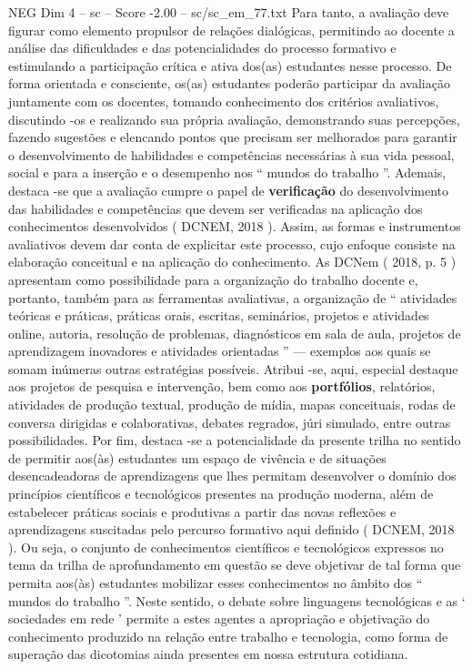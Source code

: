 \begin{textsample}{NEG Dim 4 – sc – Score -2.00 – sc/sc\_em\_77.txt}
Para tanto, a avaliação deve figurar como elemento propulsor de relações dialógicas, permitindo ao docente a análise das dificuldades e das potencialidades do processo formativo e estimulando a participação crítica e ativa dos(as) estudantes nesse processo.
De forma orientada e consciente, os(as) estudantes poderão participar da avaliação juntamente com os docentes, tomando conhecimento dos critérios avaliativos, discutindo -os e realizando sua própria avaliação, demonstrando suas percepções, fazendo sugestões e elencando pontos que precisam ser melhorados para garantir o desenvolvimento de habilidades e competências necessárias à sua vida pessoal, social e para a inserção e o desempenho nos “ mundos do trabalho ”.
Ademais, destaca -se que a avaliação cumpre o papel de \textbf{verificação} do desenvolvimento das habilidades e competências que devem ser verificadas na aplicação dos conhecimentos desenvolvidos ( DCNEM, 2018 ).
Assim, as formas e instrumentos avaliativos devem dar conta de explicitar este processo, cujo enfoque consiste na elaboração conceitual e na aplicação do conhecimento.
As DCNem ( 2018, p. 5 ) apresentam como possibilidade para a organização do trabalho docente e, portanto, também para as ferramentas avaliativas, a organização de “ atividades teóricas e práticas, práticas orais, escritas, seminários, projetos e atividades online, autoria, resolução de problemas, diagnósticos em sala de aula, projetos de aprendizagem inovadores e atividades orientadas ” — exemplos aos quais se somam inúmeras outras estratégias possíveis.
Atribui -se, aqui, especial destaque aos projetos de pesquisa e intervenção, bem como aos \textbf{portfólios}, relatórios, atividades de produção textual, produção de mídia, mapas conceituais, rodas de conversa dirigidas e colaborativas, debates regrados, júri simulado, entre outras possibilidades.
Por fim, destaca -se a potencialidade da presente trilha no sentido de permitir aos(às) estudantes um espaço de vivência e de situações desencadeadoras de aprendizagens que lhes permitam desenvolver o domínio dos princípios científicos e tecnológicos presentes na produção moderna, além de estabelecer práticas sociais e produtivas a partir das novas reflexões e aprendizagens suscitadas pelo percurso formativo aqui definido ( DCNEM, 2018 ).
Ou seja, o conjunto de conhecimentos científicos e tecnológicos expressos no tema da trilha de aprofundamento em questão se deve objetivar de tal forma que permita aos(às) estudantes mobilizar esses conhecimentos no âmbito dos “ mundos do trabalho ”.
Neste sentido, o debate sobre linguagens tecnológicas e as ‘ sociedades em rede ’ permite a estes agentes a apropriação e objetivação do conhecimento produzido na relação entre trabalho e tecnologia, como forma de superação das dicotomias ainda presentes em nossa estrutura cotidiana.

\end{textsample}
